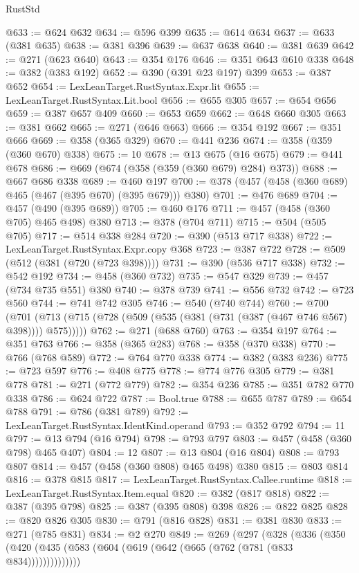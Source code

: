 \begin{lexlean}{RustStd}
\begin{coremodule}
@633 := @624 @632
@634 := @596 @399
@635 := @614 @634
@637 := @633 (@381 @635)
@638 := @381 @396
@639 := @637 @638
@640 := @381 @639
@642 := @271 (@623 @640)
@643 := @354 @176
@646 := @351 @643 @610 @338
@648 := @382 (@383 @192)
@652 := @390 (@391 @23 @197) @399
@653 := @387 @652
@654 := LexLeanTarget.RustSyntax.Expr.lit
@655 := LexLeanTarget.RustSyntax.Lit.bool
@656 := @655 @305
@657 := @654 @656
@659 := @387 @657 @409
@660 := @653 @659
@662 := @648 @660 @305
@663 := @381 @662
@665 := @271 (@646 @663)
@666 := @354 @192
@667 := @351 @666
@669 := @358 (@365 @329)
@670 := @441 @236
@674 := @358 (@359 (@360 @670) @338)
@675 := 10
@678 := @13 @675 (@16 @675)
@679 := @441 @678
@686 := @669 (@674 (@358 (@359 (@360 @679) @284) @373))
@688 := @667 @686 @338
@689 := @460 @197
@700 := @378 (@457 (@458 (@360 @689) @465 (@467 (@395 @670) (@395 @679))) @380)
@701 := @476 @689
@704 := @457 (@490 (@395 @689))
@705 := @460 @176
@711 := @457 (@458 (@360 @705) @465 @498) @380
@713 := @378 (@704 @711)
@715 := @504 (@505 @705)
@717 := @514 @338 @284
@720 := @390 (@513 @717 @338)
@722 := LexLeanTarget.RustSyntax.Expr.copy @368
@723 := @387 @722
@728 := @509 (@512 (@381 (@720 (@723 @398))))
@731 := @390 (@536 @717 @338)
@732 := @542 @192
@734 := @458 (@360 @732)
@735 := @547 @329
@739 := @457 (@734 @735 @551) @380
@740 := @378 @739
@741 := @556 @732
@742 := @723 @560
@744 := @741 @742 @305
@746 := @540 (@740 @744)
@760 := @700
    (@701 (@713 (@715 (@728 (@509 (@535 (@381 (@731 (@387 (@467 @746 @567) @398)))) @575)))))
@762 := @271 (@688 @760)
@763 := @354 @197
@764 := @351 @763
@766 := @358 (@365 @283)
@768 := @358 (@370 @338)
@770 := @766 (@768 @589)
@772 := @764 @770 @338
@774 := @382 (@383 @236)
@775 := @723 @597
@776 := @408 @775
@778 := @774 @776 @305
@779 := @381 @778
@781 := @271 (@772 @779)
@782 := @354 @236
@785 := @351 @782 @770 @338
@786 := @624 @722
@787 := Bool.true
@788 := @655 @787
@789 := @654 @788
@791 := @786 (@381 @789)
@792 := LexLeanTarget.RustSyntax.IdentKind.operand
@793 := @352 @792
@794 := 11
@797 := @13 @794 (@16 @794)
@798 := @793 @797
@803 := @457 (@458 (@360 @798) @465 @407)
@804 := 12
@807 := @13 @804 (@16 @804)
@808 := @793 @807
@814 := @457 (@458 (@360 @808) @465 @498) @380
@815 := @803 @814
@816 := @378 @815
@817 := LexLeanTarget.RustSyntax.Callee.runtime
@818 := LexLeanTarget.RustSyntax.Item.equal
@820 := @382 (@817 @818)
@822 := @387 (@395 @798)
@825 := @387 (@395 @808) @398
@826 := @822 @825
@828 := @820 @826 @305
@830 := @791 (@816 @828)
@831 := @381 @830
@833 := @271 (@785 @831)
@834 := @2 @270
@849 := @269
    (@297
      (@328
        (@336 (@350 (@420 (@435 (@583 (@604 (@619 (@642 (@665 (@762 (@781 (@833 @834))))))))))))))

\end{coremodule}
\end{lexlean}
